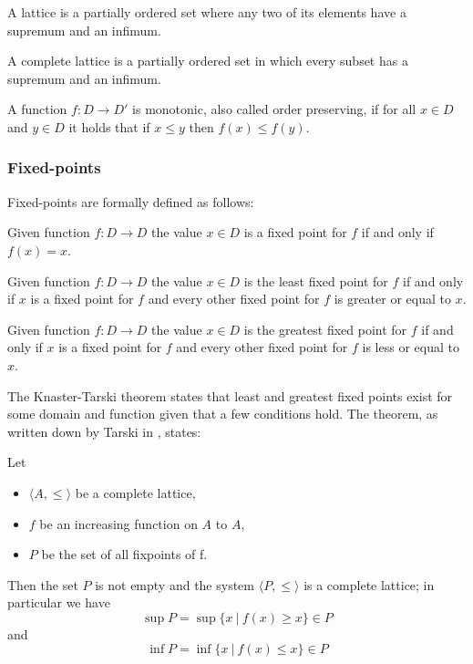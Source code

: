 \begin{definition}
	A lattice is a partially ordered set where any two of its elements have a supremum and an infimum.
\end{definition}

\begin{definition}
	A complete lattice is a partially ordered set in which every subset has a supremum and an infimum.
\end{definition}

\begin{definition}
	A function $f : D \rightarrow D'$ is monotonic, also called order preserving, if for all $x \in D$ and $y \in D$ it holds that if $x \leq y$ then $f(x) \leq f(y)$.
\end{definition}
\subsubsection{Fixed-points}
Fixed-points are formally defined as follows:
\begin{definition}
	Given function $f : D \rightarrow D$ the value $x \in D$ is a fixed point for $f$ if and only if $f(x) = x$.
\end{definition}
\begin{definition}
	Given function $f : D \rightarrow D$ the value $x \in D$ is the least fixed point for $f$ if and only if $x$ is a fixed point for $f$ and every other fixed point for $f$ is greater or equal to $x$.
\end{definition}
\begin{definition}
	Given function $f : D \rightarrow D$ the value $x \in D$ is the greatest fixed point for $f$ if and only if $x$ is a fixed point for $f$ and every other fixed point for $f$ is less or equal to $x$.
\end{definition}
The Knaster-Tarski theorem states that least and greatest fixed points exist for some domain and function given that a few conditions hold.
The theorem, as written down by Tarski in \cite{tarski1955}, states:
\begin{theorem}
	\label{the_knaster_tarski}
	Let
	\begin{itemize}
		\item $\langle A, \leq \rangle$ be a complete lattice,
		\item $f$ be an increasing function on $A$ to $A$,
		\item $P$ be the set of all fixpoints of f.
	\end{itemize}
	Then the set $P$ is not empty and the system $\langle P, \leq \rangle$ is a complete lattice; in particular we have 
	\[ \sup P = \sup \{ x\ |\ f(x) \geq x \} \in P \]
	and
	\[ \inf P = \inf \{ x\ |\ f(x) \leq x \} \in P \]
\end{theorem}


